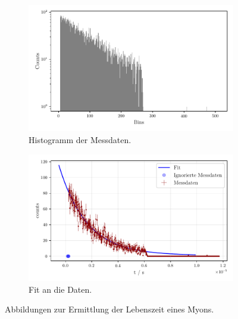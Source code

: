 \begin{figure}%
    \begin{subfigure}{0.48\textwidth}%
    \centering%
    \includegraphics[width=\textwidth]{build/myonenhist.pdf}%
    \caption{Histogramm der Messdaten.}%
    \label{fig:histogramm}%
    \end{subfigure}%
    \hfill%
    \begin{subfigure}{0.48\textwidth}%
        \centering%
        \includegraphics[width=\textwidth]{build/myonenfit.pdf}%
        \caption{Fit an die Daten.}%
        \label{fig:myonenfit}%
        \end{subfigure}%
    \caption{Abbildungen zur Ermittlung der Lebenszeit eines Myons.}
    \label{subfig:myonen}    
\end{figure}%

